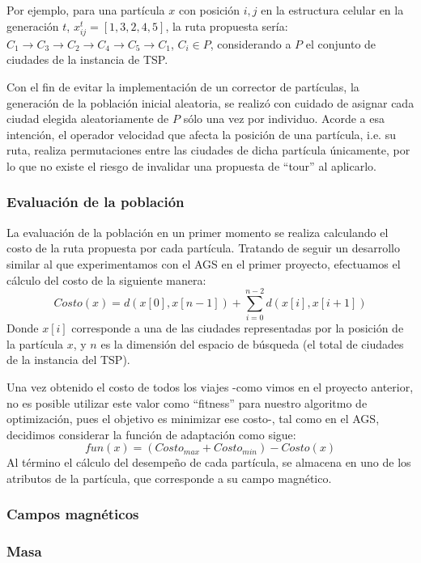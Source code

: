 \documentclass[12pt]{article}
\begin{document}
Por ejemplo, para una partícula $x$ con posición $i,j$ en la estructura celular en la generación $t$,
$x_{ij}^t = [1,3,2,4,5]$, la ruta propuesta sería: $C_1 \to C_3 \to C_2 \to C_4 \to C_5 \to C_1$, $C_i \in P$, considerando a $P$ el conjunto de ciudades de la instancia de TSP.

Con el fin de evitar la implementación de un corrector de partículas, la generación de la población inicial aleatoria, se realizó con cuidado de asignar cada ciudad elegida aleatoriamente de $P$ sólo una vez por individuo. Acorde a esa intención, el operador velocidad que afecta la posición de una partícula, i.e. su ruta, realiza permutaciones entre las ciudades de dicha partícula únicamente, por lo que no existe el riesgo de invalidar una propuesta de ``tour'' al aplicarlo.

\subsubsection*{Evaluación de la población}
La evaluación de la población en un primer momento se realiza calculando el costo de la ruta propuesta por cada partícula. Tratando de seguir un
desarrollo similar al que experimentamos con el AGS en el primer proyecto, efectuamos el cálculo del costo de la siguiente manera:
\begin{equation}
  Costo(x) = d(x[0],x[n-1]) + \sum\limits_{i=0}^{n-2} d(x[i],x[i+1])
\end{equation}
Donde $x[i]$ corresponde a una de las ciudades representadas por la posición de la partícula $x$, y $n$ es la dimensión del espacio de búsqueda (el total de ciudades de la instancia del TSP).

Una vez obtenido el costo de todos los viajes -como vimos en el proyecto
anterior, no es posible utilizar este valor como ``fitness'' para nuestro algoritmo de optimización, pues el objetivo es minimizar ese costo-,
tal como en el AGS, decidimos considerar la función de
adaptación como sigue:
\begin{equation}
  fun(x) = (Costo_{max} + Costo_{min})-Costo(x)
\end{equation}
Al término el cálculo del desempeño de cada partícula, se almacena en uno de los atributos de la partícula, que corresponde a su campo magnético.

\subsubsection*{Campos magnéticos}
\subsubsection*{Masa}
\end{document}
